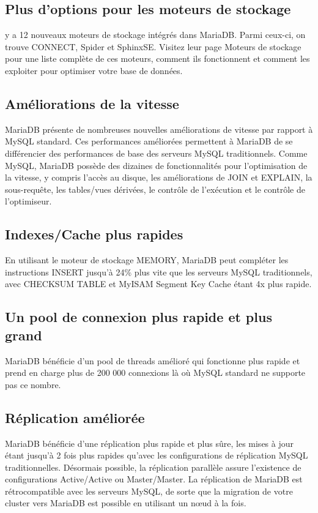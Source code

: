 \subsection{Plus d'options pour les moteurs de stockage}
 y a 12 nouveaux moteurs de stockage intégrés dans MariaDB. Parmi ceux-ci, on trouve CONNECT, Spider et SphinxSE. Visitez leur page Moteurs de stockage pour une liste complète de ces moteurs, comment ils fonctionnent et comment les exploiter pour optimiser votre base de données.
\subsection{Améliorations de la vitesse}
MariaDB présente de nombreuses nouvelles améliorations de vitesse par rapport à MySQL standard. Ces performances améliorées permettent à MariaDB de se différencier des performances de base des serveurs MySQL traditionnels. Comme MySQL, MariaDB possède des dizaines de fonctionnalités pour l'optimisation de la vitesse, y compris l'accès au disque, les améliorations de JOIN et EXPLAIN, la sous-requête, les tables/vues dérivées, le contrôle de l'exécution et le contrôle de l'optimiseur.
\subsection{Indexes/Cache plus rapides}
En utilisant le moteur de stockage MEMORY, MariaDB peut compléter les instructions INSERT jusqu'à 24\% plus vite que les serveurs MySQL traditionnels, avec CHECKSUM TABLE et MyISAM Segment Key Cache étant 4x plus rapide.
\subsection{Un pool de connexion plus rapide et plus grand}
MariaDB bénéficie d'un pool de threads amélioré qui fonctionne plus rapide et prend en charge plus de 200 000 connexions là où MySQL standard ne supporte pas ce nombre.
\subsection{Réplication améliorée}
MariaDB bénéficie d'une réplication plus rapide et plus sûre, les mises à jour étant jusqu'à 2 fois plus rapides qu'avec les configurations de réplication MySQL traditionnelles. Désormais possible, la réplication parallèle assure l'existence de configurations Active/Active ou Master/Master. La réplication de MariaDB est rétrocompatible avec les serveurs MySQL, de sorte que la migration de votre cluster vers MariaDB est possible en utilisant un nœud à la fois.
